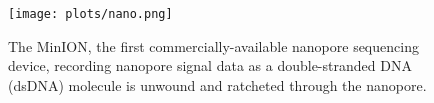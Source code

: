 \begin{figure}
\centering
\texttt{[image: plots/nano.png]}
\caption[\label{fig:nano}The MinION, the first commercially-available nanopore sequencing device, recording nanopore signal data as a double-stranded DNA (dsDNA) molecule is unwound and ratcheted through the nanopore.]{\label{fig:nano}The MinION, the first commercially-available nanopore sequencing device, recording nanopore signal data as a double-stranded DNA (dsDNA) molecule is unwound and ratcheted through the nanopore\protect\footnotemark[3].}
\end{figure}
